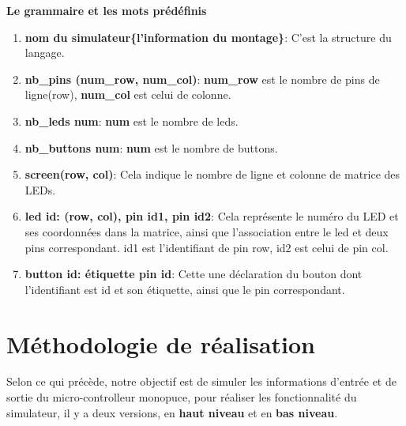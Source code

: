\documentclass[14px]{article}
\begin{document}
\begin{figure}[htbp]
\end{figure}

\textbf{Le grammaire et les mots prédéfinis}
\begin{enumerate}
	\item \textbf{nom du simulateur\{l'information du montage\}}: C'est la structure du langage.
	\item \textbf{nb\_pins (num\_row, num\_col)}: \textbf{num\_row} est le nombre de pins de ligne(row), \textbf{num\_col} est celui de colonne.
	\item \textbf{nb\_leds num}: \textbf{num} est le nombre de leds.
	\item \textbf{nb\_buttons num}: \textbf{num} est le nombre de buttons.
	\item \textbf{screen(row, col)}: Cela indique le nombre de ligne et colonne de matrice des LEDs.
	\item \textbf{led id: (row, col), pin id1, pin id2}: Cela représente le numéro du LED et ses coordonnées dans la matrice, ainsi que l'association entre le led et deux pins correspondant. id1 est l'identifiant de pin row, id2 est celui de pin col.
	\item \textbf{button id: étiquette pin id}: Cette une déclaration du bouton dont l'identifiant est id et son étiquette, ainsi que le pin correspondant.
\end{enumerate}

\clearpage
\pagestyle{fancy}
\rhead{\thepage}
\fancyfoot{}

\clearpage

\section{Méthodologie de réalisation}
Selon ce qui précède, notre objectif est de simuler les informations d'entrée et de sortie du micro-controlleur monopuce, pour réaliser les fonctionnalité du simulateur, il y a deux versions, en \textbf{haut niveau} et en \textbf{bas niveau}.
\end{document}
